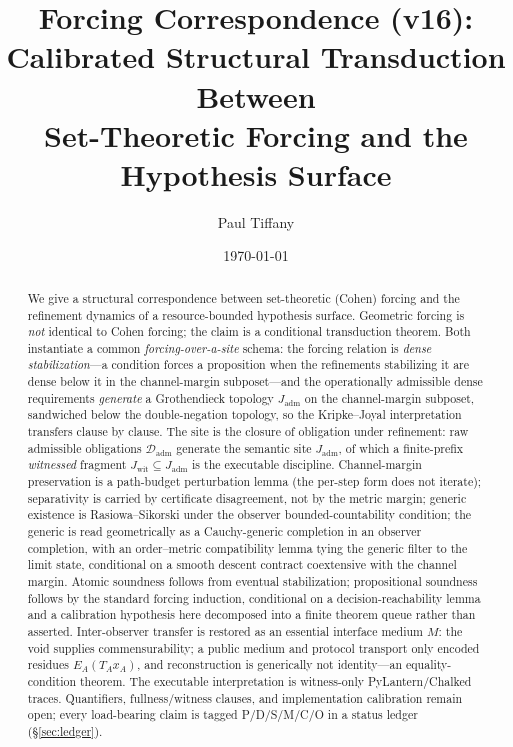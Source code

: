 \documentclass[11pt]{article}
\title{Forcing Correspondence (v16):\\ Calibrated Structural Transduction Between\\
Set-Theoretic Forcing and the Hypothesis Surface}
\author{Paul Tiffany}
\date{\today}
\theoremstyle{definition}
\theoremstyle{remark}
\newcommand{\Dadm}{\mathcal{D}_{\mathrm{adm}}}
\newcommand{\Jadm}{J_{\mathrm{adm}}}
\newcommand{\Jwit}{J_{\mathrm{wit}}}
\begin{document}
\maketitle

\begin{abstract}
We give a structural correspondence between set-theoretic (Cohen) forcing and the refinement
 dynamics of a resource-bounded hypothesis surface. Geometric forcing is \emph{not} identical to
 Cohen forcing; the claim is a conditional transduction theorem. Both instantiate a common
 \emph{forcing-over-a-site} schema: the forcing relation is \emph{dense stabilization}---a condition
 forces a proposition when the refinements stabilizing it are dense below it in the channel-margin
 subposet---and the operationally admissible dense requirements \emph{generate} a Grothendieck
 topology $\Jadm$ on the channel-margin subposet, sandwiched below the double-negation topology, so
 the Kripke--Joyal interpretation transfers clause by clause. The site is the closure of obligation
 under refinement: raw admissible obligations $\Dadm$ generate the semantic site $\Jadm$, of which a
 finite-prefix \emph{witnessed} fragment $\Jwit\subseteq\Jadm$ is the executable discipline.
 Channel-margin preservation is a path-budget perturbation lemma (the per-step form does not
 iterate); separativity is carried by certificate disagreement, not by the metric margin; generic existence is Rasiowa--Sikorski under the observer
 bounded-countability condition; the generic is read geometrically as a Cauchy-generic completion in
 an observer completion, with an order--metric compatibility lemma tying the generic filter to the
 limit state, conditional on a smooth descent contract coextensive with the channel margin. Atomic
 soundness follows from eventual stabilization; propositional soundness follows by the standard
 forcing induction, conditional on a decision-reachability lemma and a calibration hypothesis here
 decomposed into a finite theorem queue rather than asserted. Inter-observer transfer is restored as
 an essential interface medium $M$: the void supplies commensurability; a public medium and protocol
 transport only encoded residues $E_A(T_Ax_A)$, and reconstruction is generically not identity---an
 equality-condition theorem. The executable interpretation is witness-only PyLantern/Chalked traces.
 Quantifiers, fullness/witness clauses, and implementation calibration remain open; every load-bearing
 claim is tagged P/D/S/M/C/O in a status ledger (\S\ref{sec:ledger}).
\end{abstract}
\end{document}
